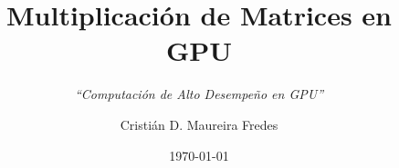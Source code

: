 \documentclass{beamer}
\author{\large Cristián D. Maureira Fredes}
\title{\huge Multiplicación de Matrices en GPU}
\subtitle{\large \textit{``Computación de Alto Desempeño en GPU''}}
\institute{\textbf{Departamento de Informática\\ (UTFSM)}}
\date{\today}
\begin{document}
\begin{frame}[t,plain]
\titlepage
\end{frame}






\end{document}
